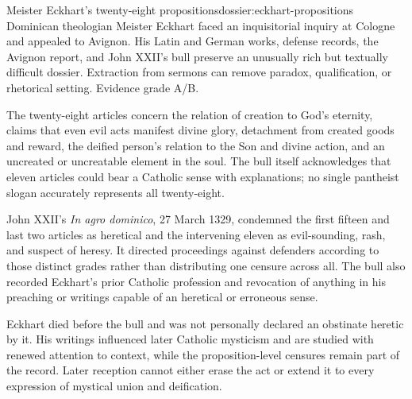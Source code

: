 \begin{heresydossier}{Meister Eckhart's twenty-eight propositions}{dossier:eckhart-propositions}
\objectfield Dominican theologian Meister Eckhart faced an inquisitorial inquiry at Cologne and appealed to Avignon. His Latin and German works, defense records, the Avignon report, and John XXII's bull preserve an unusually rich but textually difficult dossier. Extraction from sermons can remove paradox, qualification, or rhetorical setting. Evidence grade A/B.

\propositionfield The twenty-eight articles concern the relation of creation to God's eternity, claims that even evil acts manifest divine glory, detachment from created goods and reward, the deified person's relation to the Son and divine action, and an uncreated or uncreatable element in the soul. The bull itself acknowledges that eleven articles could bear a Catholic sense with explanations; no single pantheist slogan accurately represents all twenty-eight.

\responsefield John XXII's \emph{In agro dominico}, 27 March 1329, condemned the first fifteen and last two articles as heretical and the intervening eleven as evil-sounding, rash, and suspect of heresy. It directed proceedings against defenders according to those distinct grades rather than distributing one censure across all. The bull also recorded Eckhart's prior Catholic profession and revocation of anything in his preaching or writings capable of an heretical or erroneous sense.

\aftermathfield Eckhart died before the bull and was not personally declared an obstinate heretic by it. His writings influenced later Catholic mysticism and are studied with renewed attention to context, while the proposition-level censures remain part of the record. Later reception cannot either erase the act or extend it to every expression of mystical union and deification.
\end{heresydossier}

